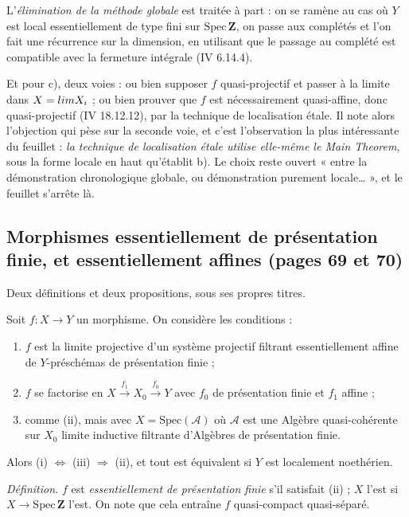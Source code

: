 \documentclass[11pt,a4paper]{article}
\begin{document}
L'\emph{élimination de la méthode globale} est traitée à part : on se ramène au
cas où $Y$ est local essentiellement de type fini sur $\mathrm{Spec}\,\mathbf{Z}$,
on passe aux complétés et l'on fait une récurrence sur la dimension, en
utilisant que le passage au complété est compatible avec la fermeture intégrale
(IV 6.14.4).

Et pour c), deux voies : ou bien supposer $f$ quasi-projectif et passer à la
limite dans $X = \varprojlim X_{i}$ ; ou bien prouver que $f$ est nécessairement
quasi-affine, donc quasi-projectif (IV 18.12.12), par la technique de
localisation étale. Il note alors l'objection qui pèse sur la seconde voie, et
c'est l'observation la plus intéressante du feuillet : \emph{la technique de
localisation étale utilise elle-même le Main Theorem}, sous la forme locale en
haut qu'établit b). Le choix reste ouvert « entre la démonstration chronologique
globale, ou démonstration purement locale… », et le feuillet s'arrête là.

\subsection*{Morphismes essentiellement de présentation finie, et essentiellement affines (pages 69 et 70)}

Deux définitions et deux propositions, sous ses propres titres.

Soit $f : X \to Y$ un morphisme. On considère les conditions :

\begin{enumerate}
  \item[(i)] $f$ est la limite projective d'un système projectif filtrant
  essentiellement affine de $Y$-préschémas de présentation finie ;
  \item[(ii)] $f$ se factorise en $X \xrightarrow{f_{1}} X_{0}
  \xrightarrow{f_{0}} Y$ avec $f_{0}$ de présentation finie et $f_{1}$ affine ;
  \item[(iii)] comme (ii), mais avec $X = \mathrm{Spec}(\mathcal{A})$ où
  $\mathcal{A}$ est une Algèbre quasi-cohérente sur $X_{0}$ limite inductive
  filtrante d'Algèbres de présentation finie.
\end{enumerate}

Alors (i) $\Leftrightarrow$ (iii) $\Rightarrow$ (ii), et tout est équivalent si
$Y$ est localement noethérien.

\emph{Définition.} $f$ est \emph{essentiellement de présentation finie} s'il
satisfait (ii) ; $X$ l'est si $X \to \mathrm{Spec}\,\mathbf{Z}$ l'est. On note
que cela entraîne $f$ quasi-compact quasi-séparé.
\end{document}
